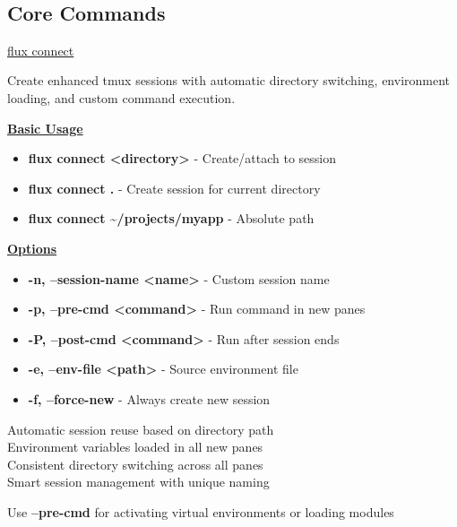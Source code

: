 \documentclass[10pt,a4paper]{article}
\title{ }
\date{}
\begin{document}
\small
\begin{multicols}{3}

\thispagestyle{empty}
\scriptsize

\section{Core Commands}

\begin{textbox}{\href{https://github.com/lotape6/flux-capacitor}{flux connect}}

Create enhanced tmux sessions with automatic directory switching, environment loading, and custom command execution.

\underline{\textbf{Basic Usage}}
\begin{itemize}
    \item \textbf{flux connect <directory>} - Create/attach to session
    \item \textbf{flux connect .} - Create session for current directory
    \item \textbf{flux connect \textasciitilde/projects/myapp} - Absolute path
\end{itemize}

\underline{\textbf{Options}}
\begin{itemize}
    \item \textbf{-n, --session-name <name>} - Custom session name
    \item \textbf{-p, --pre-cmd <command>} - Run command in new panes
    \item \textbf{-P, --post-cmd <command>} - Run after session ends
    \item \textbf{-e, --env-file <path>} - Source environment file
    \item \textbf{-f, --force-new} - Always create new session
\end{itemize}


Automatic session reuse based on directory path\\

Environment variables loaded in all new panes\\

Consistent directory switching across all panes\\

Smart session management with unique naming\\


Use \textbf{--pre-cmd} for activating virtual environments or loading modules\\


\end{textbox}
\end{multicols}
\end{document}
